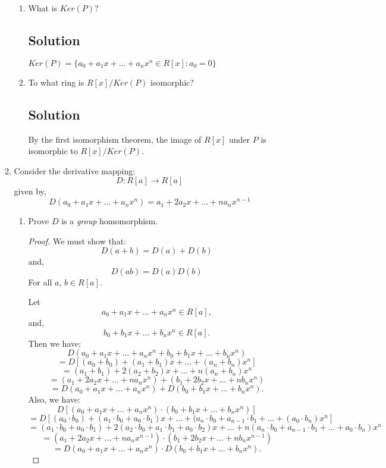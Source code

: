 \documentclass[12pt]{amsart}
\begin{document}
\begin{enumerate}
\begin{enumerate}
\begin{enumerate}
\item What is $Ker(P)$?

\subsection*{Solution}
$Ker(P) = \{ a_0 + a_1 x + \ldots + a_n x^n \in R[x] : a_0 = 0\}$

\item To what ring is $R[x] / Ker(P)$ isomorphic?

\subsection*{Solution}
By the first isomorphism theorem, the image of $R[x]$ under $P$ is isomorphic to $R[x] / Ker(P)$.

\end{enumerate}

\item Consider the derivative mapping:
%
\[ D : R[a] \to R[a] \]
%
given by,
%
\[ D(a_0 + a_1 x + \ldots + a_n x^n) = a_1 + 2a_2 x + \ldots + n a_n x^{n-1} \]
%
\begin{enumerate}\setlength{\itemsep}{6pt}
\item Prove $D$ is a {\it group} homomorphism.

\begin{proof}
We must show that:
%
\[ D(a + b) = D(a) + D(b) \]
%
and,
%
\[ D(ab) = D(a)D(b) \]
%
For all $a,\,b \in R[a]$.

\bigskip

Let
%
\[ a_0 + a_1 x + \ldots + a_n x^n \in R[a], \]
%
and,
%
\[ b_0 + b_1 x + \ldots + b_n x^n \in R[a]. \]
%
Then we have:
%
\[ D(a_0 + a_1 x + \ldots + a_n x^n + b_0 + b_1 x + \ldots + b_n x^n) \]
\[ = D[ (a_0+b_0) + (a_1+b_1)x + \ldots + (a_n + b_n)x^n] \]
\[ = (a_1+b_1) + 2(a_2+b_2)x + \ldots + n(a_n+b_n)x^n \]
\[ = (a_1 + 2a_2x + \ldots + na_nx^n) + (b_1 + 2b_2x + \ldots + nb_nx^n)  \]
\[ = D(a_0 + a_1 x + \ldots + a_n x^n) + D(b_0 + b_1 x + \ldots + b_n x^n). \]
%
Also, we have:
%
\[ D[ (a_0 + a_1 x + \ldots + a_n x^n) \cdot (b_0 + b_1 x + \ldots + b_n x^n) ] \]
\[ = D[ (a_0\cdot b_0) + (a_1\cdot b_0 + a_0\cdot b_1)x + \ldots + (a_n\cdot b_0 + a_{n-1}\cdot b_1 + \ldots + (a_0\cdot b_n)x^n ] \]
\[ = (a_1\cdot b_0 + a_0\cdot b_1) + 2(a_2\cdot b_0 + a_1\cdot b_1 + a_0\cdot b_2)x + \ldots + n(a_n\cdot b_0 + a_{n-1}\cdot b_1 + \ldots + a_0\cdot b_n)x^n \]
\[ = (a_1 + 2a_2 x + \ldots + n a_n x^{n-1} ) \cdot (b_1 + 2b_2 x + \ldots + n b_n x^{n-1}) \]
\[ = D(a_0 + a_1 x + \ldots + a_n x^n) \cdot D(b_0 + b_1 x + \ldots + b_n x^n). \]
\end{proof}


\end{enumerate}
\end{enumerate}
\end{enumerate}
\end{document}
